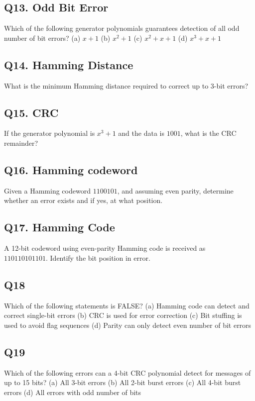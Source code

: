 \subsection*{Q13. Odd Bit Error}
Which of the following generator polynomials guarantees detection of all odd number of bit errors?  
(a) $x + 1$  
(b) $x^2 + 1$  
(c) $x^2 + x + 1$  
(d) $x^3 + x + 1$

\subsection*{Q14. Hamming Distance}
What is the minimum Hamming distance required to correct up to 3-bit errors?

\subsection*{Q15. CRC}
If the generator polynomial is $x^3 + 1$ and the data is $1001$, what is the CRC remainder?

\subsection*{Q16. Hamming codeword}
Given a Hamming codeword $1100101$, and assuming even parity, determine whether an error exists and if yes, at what position.

\subsection*{Q17. Hamming Code}
A 12-bit codeword using even-parity Hamming code is received as\\ 
$110110101101$. Identify the bit position in error.

\subsection*{Q18}
Which of the following statements is FALSE?  
(a) Hamming code can detect and correct single-bit errors  
(b) CRC is used for error correction  
(c) Bit stuffing is used to avoid flag sequences  
(d) Parity can only detect even number of bit errors

\subsection*{Q19}
Which of the following errors can a 4-bit CRC polynomial detect for messages of up to 15 bits?  
(a) All 3-bit errors  
(b) All 2-bit burst errors  
(c) All 4-bit burst errors  
(d) All errors with odd number of bits

